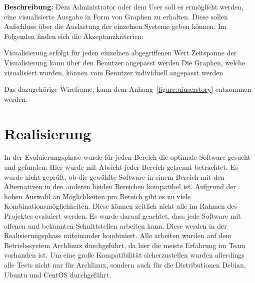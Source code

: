 \textbf{Beschreibung:} Dem Administrator oder dem User soll es ermöglicht
werden, eine visualisierte Ausgabe in Form von Graphen zu erhalten. Diese
sollen Aufschluss über die Auslastung der einzelnen Systeme geben können. Im
Folgenden finden sich die Akzeptanzkriterien:

\begin{outline}
  \1 Visualisierung erfolgt für jeden einzelnen abgegriffenen Wert
  \1 Zeitspanne der Visualisierung kann über den Benutzer angepasst werden
  \1 Die Graphen, welche visualisiert wurden, können vom Benutzer individuell
  angepasst werden
\end{outline}

Das dazugehörige Wireframe, kann dem Anhang~\ref{figure:uiuserstory}
entnommen werden.
\mr%

\chapter{Realisierung}
In der Evaluierungsphase wurde für jeden Bereich die optimale Software gesucht
und gefunden. Hier wurde mit Absicht jeder Bereich getrennt betrachtet. Es
wurde nicht geprüft, ob die gewählte Software in einem Bereich mit den
Alternativen in den anderen beiden Bereichen kompatibel ist. Aufgrund der hohen
Auswahl an Möglichkeiten pro Bereich gibt es zu viele
Kombinationsmöglichkeiten. Diese können zeitlich nicht alle im Rahmen des
Projektes evaluiert werden. Es wurde darauf geachtet, dass jede Software mit
offenen und bekannten Schnittstellen arbeiten kann. Diese werden in der
Realisierungsphase miteinander kombiniert. Alle arbeiten wurden auf dem
Betriebssystem Archlinux durchgeführt, da hier die meiste Erfahrung im Team
vorhanden ist. Um eine große Kompatibilität sicherzustellen wurden allerdings
alle Tests nicht nur für Archlinux, sondern auch für die Distributionen Debian,
Ubuntu und CentOS durchgeführt.

